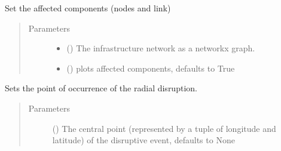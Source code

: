\documentclass[letterpaper,10pt,english]{sphinxmanual}
\begin{document}
\begin{fulllineitems}
\begin{fulllineitems}
\label{\detokenize{apidoc:dreaminsg_integrated_model.src.hazard_initiator.RadialDisruption.set_affected_components}}
\sphinxAtStartPar
Set the affected components (nodes and link)
\begin{quote}\begin{description}
\item[{Parameters}] \leavevmode\begin{itemize}
\item {} 
\sphinxAtStartPar
{} () \textendash{} The infrastructure network as a networkx graph.

\item {} 
\sphinxAtStartPar
{} (\sphinxstyleliteralemphasis{\sphinxupquote{, }}) \textendash{} plots affected components, defaults to True

\end{itemize}

\end{description}\end{quote}

\end{fulllineitems}


\begin{fulllineitems}
\label{\detokenize{apidoc:dreaminsg_integrated_model.src.hazard_initiator.RadialDisruption.set_point_of_occurrence}}
\sphinxAtStartPar
Sets the point of occurrence of the radial disruption.
\begin{quote}\begin{description}
\item[{Parameters}] \leavevmode
\sphinxAtStartPar
{} (\sphinxstyleliteralemphasis{\sphinxupquote{, }}) \textendash{} The central point (represented by a tuple of longitude and latitude) of the disruptive event, defaults to None


\end{description}
\end{quote}
\end{fulllineitems}
\end{fulllineitems}
\end{document}
